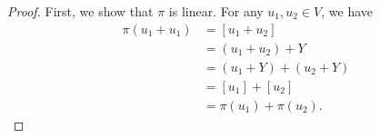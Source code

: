 \documentclass[a4paper]{article}
\begin{document}
\begin{enumerate}
        \begin{proof}
        First, we show that \( \pi  \) is linear. For any \( {u}_{1}, {u}_{2} \in V  \), we have 
        \begin{align*}
            \pi({u}_{1} + {u}_{1}) &= [{u}_{1} + {u}_{2}] \\
                                   &= ({u}_{1} + {u}_{2}) + Y  \\
                                   &= ({u}_{1} + Y) + ({u}_{2} + Y) \\
                                   &= [{u}_{1}] + [{u}_{2}] \\
                                   &= \pi({u}_{1}) + \pi({u}_{2}).
        \end{align*} 
        \end{proof}
\end{enumerate}
\end{document}
